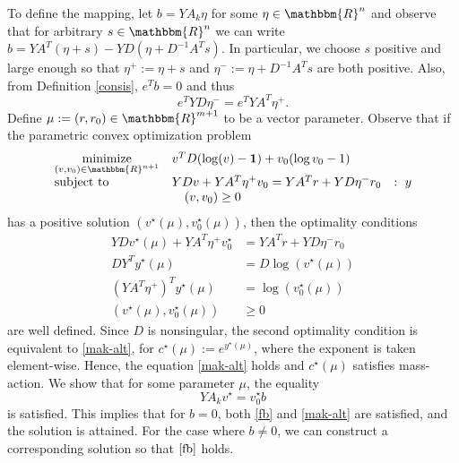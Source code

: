 \documentclass[smallextended]{svjour3}       %
\newcommand*{\0}{\mathbf{0}}
\newcommand*{\1}{\mathbf{1}}
\newcommand*{\minimize}{\text{minimize}}
\newcommand*{\st}{\text{subject to}}
\newcommand*{\R}{\mathbbm{R}}
\begin{document}
To define the mapping, let $b=YA_k\eta$ for some $\eta \in \R^n$ and observe
that for arbitrary $s \in \R^n$ we can write $b = YA^T(\eta +s) - YD(\eta +
D^{-1}A^Ts)$.  In particular, we choose $s$ positive and large enough so
that $\eta^+ := \eta+s$ and $\eta^- := \eta + D^{-1}A^Ts$ are both positive.
Also, from Definition \ref{consis}, $e^Tb = 0$ and thus
\begin{equation}
  e^TYD\eta^- = e^TYA^T\eta^+.
  \label{massbalanceb}
\end{equation}
Define $\mu:=(r,r_0) \in \R^{m+1}$ to be a vector parameter.  Observe that if
the parametric convex optimization problem
\begin{equation}
	\begin{array}{lll}
  \underset{(v,v_0)\in\R^{n+1}}{\minimize} & v^T D(\log(v)-\1) + v_0(\log v_0 -1) \\
	\st &  YD v + YA^T\eta^+ v_0 = YA^Tr + YD\eta^-r_0 &:\ y \\
	    &\quad (v,v_0) \ge 0                     
	\end{array}
	\label{convex-fix}
\end{equation}
has a positive solution $(v^\star(\mu),v_0^\star(\mu))$, then the optimality
conditions
\begin{equation}
	\begin{array}{rl}
	YDv^\star(\mu)  + YA^T\eta^+ v^\star_0  &= YA^Tr + YD\eta^-r_0  \\
	DY^T y^\star(\mu) &= D\log(v^\star(\mu))  \\
	(YA^T\eta^+)^Ty^\star(\mu)   &= \log(v^\star_0(\mu)) \\
	(v^\star(\mu),v_0^\star(\mu)) &\ge 0
	\end{array}
	\label{optcon}
\end{equation}
are well defined. Since $D$ is nonsingular, the second optimality condition is
equivalent to \eqref{mak-alt}, for $c^\star(\mu) := e^{y^\star(\mu)}$, where
the exponent is taken element-wise.  Hence, the equation \eqref{mak-alt} holds
and $c^\star(\mu)$ satisfies mass-action. We show that for some parameter
$\mu$, the equality 
\begin{equation}
 YA_kv^\star=v^\star_0b
  \label{scaled-fb}
\end{equation} is
satisfied. This implies that for $b=0$, both \eqref{fb} and \eqref{mak-alt} are
satisfied, and the solution is attained. For the case where $b\neq 0$, we can
construct a corresponding solution so that $\eqref{fb}$ holds.
\end{document}
